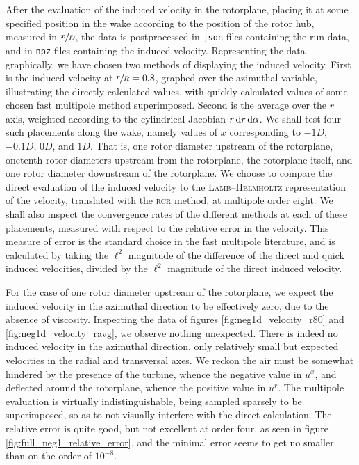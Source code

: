 After the evaluation of the induced velocity in the rotorplane, placing it at some specified position in the wake according to the position of the rotor hub, measured in $\sfrac{x}{D}$, the data is postprocessed in \texttt{json}-files containing the run data, and in \texttt{npz}-files containing the induced velocity.
Representing the data graphically, we have chosen two methods of displaying the induced velocity.
First is the induced velocity at $\sfrac{r}{R} = 0.8$, graphed over the azimuthal variable, illustrating the directly calculated values, with quickly calculated values of some chosen fast multipole method superimposed.
Second is the average over the $r$ axis, weighted according to the cylindrical Jacobian $r\,\mathrm{d} r\,\mathrm{d}\alpha$.
We shall test four such placements along the wake, namely values of $x$ corresponding to $-1D$, $-0.1D$, $0D$, and $1D$.
That is, one rotor diameter upstream of the rotorplane, onetenth rotor diameters upstream from the rotorplane, the rotorplane itself, and one rotor diameter downstream of the rotorplane.
We choose to compare the direct evaluation of the induced velocity to the \textsc{Lamb}--\textsc{Helmholtz} representation of the velocity, translated with the \textsc{rcr} method, at multipole order eight.
We shall also inspect the convergence rates of the different methods at each of these placements, measured with respect to the relative error in the velocity.
This measure of error is the standard choice in the fast multipole literature, and is calculated by taking the $\ell^2$ magnitude of the difference of the direct and quick induced velocities, divided by the $\ell^2$ magnitude of the direct induced velocity.

For the case of one rotor diameter upstream of the rotorplane, we expect the induced velocity in the azimuthal direction to be effectively zero, due to the absence of viscosity.
Inspecting the data of figures \ref{fig:neg1d_velocity_r80} and \ref{fig:neg1d_velocity_ravg}, we observe nothing unexpected.
There is indeed no induced velocity in the azimuthal direction, only relatively small but expected velocities in the radial and transversal axes.
We reckon the air must be somewhat hindered by the presence of the turbine, whence the negative value in $u^x$, and deflected around the rotorplane, whence the positive value in $u^r$.
The multipole evaluation is virtually indistinguishable, being sampled sparsely to be superimposed, so as to not visually interfere with the direct calculation.
The relative error is quite good, but not excellent at order four, as seen in figure \ref{fig:full_neg1_relative_error}, and the minimal error seems to get no smaller than on the order of $10^{-8}$.

